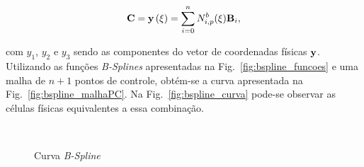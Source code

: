 \documentclass[tese_patricia]{subfiles}
\begin{document}
\begin{align}
\mathbf{C} =\mathbf{y}\left(\xi\right) = \sum_{i=0}^{n}N^b_{i,p}(\xi)\mathbf{B}_i,
\end{align}

\noindent com $y_1$, $y_2$ e $y_3$ sendo as componentes do vetor de coordenadas físicas $\mathbf{y}$. Utilizando as funções \textit{B-Splines} apresentadas na Fig.~\ref{fig:bspline_funcoes} e uma malha de $n+1$ pontos de controle, obtém-se a curva apresentada na Fig.~\ref{fig:bspline_malhaPC}. Na Fig.~\ref{fig:bspline_curva} pode-se observar as células físicas equivalentes a essa combinação.

\begin{figure}[!htb]
	\centering	
	 \ \ 
	\caption{Curva \textit{B-Spline}}
\end{figure}
\end{document}
